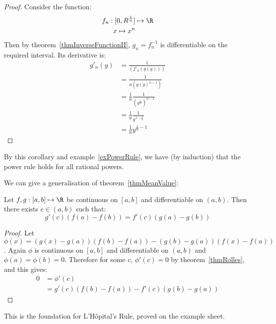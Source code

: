 \documentclass[../Main.tex]{subfiles}
\begin{document}
\begin{proof}
    Consider the function:
    \begin{align*}
        f_n : [0, R^{\frac{1}{n}}] &\mapsto \R \\
        x \mapsto x^n
    \end{align*}
    Then by theorem~\ref{thmInverseFunctionII}, $g_n = f_n^{-1}$ is differentiable on the required interval. Its derivative is:
    \begin{align*}
        g'_n(y) &= \frac{1}{(f'_n(g(y)))} \\
        &= \frac{1}{n (g(y)^{n-1})} \\
        &= \frac{1}{n}\frac{1}{(y^{\frac{1}{n}})^{n-1}} \\
        &= \frac{1}{n}\frac{1}{y^{1 - \frac{1}{n}}} \\
        &= \frac{1}{n} y^{\frac{1}{n} - 1}
    \end{align*}
\end{proof}
\begin{remark}
    By this corollary and example~\ref{exPowerRule}, we have (by induction) that the power rule holds for all rational powers.
\end{remark}
We can give a generalisation of theorem~\ref{thmMeanValue}:
\begin{theorem}
    Let $f, g : [a, b] \mapsto \R$ be continuous on $[a, b]$ and differentiable on $(a, b)$. Then there exists $c \in (a, b)$ such that:
    \begin{equation*}
        g'(c)(f(a) - f(b)) = f'(c)(g(a) - g(b))
    \end{equation*}
    \label{thmCauchyMeanValue}
\end{theorem}
\begin{proof}
    Let $\phi(x) = (g(x) - g(a))(f(b) - f(a)) - (g(b) - g(a))(f(x) - f(a))$. Again $\phi$ is continuous on $[a, b]$ and differentiable on $(a, b)$ and $\phi(a) = \phi(b) = 0$. Therefore for some $c$, $\phi'(c) = 0$ by theorem~\ref{thmRolles}, and this gives:
    \begin{align*}
        0 &= \phi'(c) \\
        &= g'(c) (f(b) - f(a)) - f'(c)(g(b) - g(a))
    \end{align*}
\end{proof}
\begin{remark}
    This is the foundation for L'H\^opital's Rule, proved on the example sheet.
\end{remark}
\end{document}
